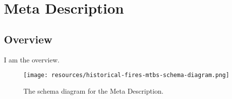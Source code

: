 \section{Meta Description}
\label{sec:meta-description}
\subsection{Overview}
\label{ssec:overview}

I am the overview.

\begin{figure}[h!]
  \begin{center}
    \texttt{[image: resources/historical-fires-mtbs-schema-diagram.png]}
  \end{center}
  \caption{The schema diagram for the Meta Description.}
  \label{fig:ov-diagram}
\end{figure}


